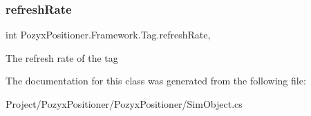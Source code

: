 \subsubsection{\texorpdfstring{refresh\+Rate}{refreshRate}}
{\footnotesize\ttfamily int Pozyx\+Positioner.\+Framework.\+Tag.\+refresh\+Rate\hspace{0.3cm}{\ttfamily [get]}, {\ttfamily [set]}}



The refresh rate of the tag 



The documentation for this class was generated from the following file\+:\begin{DoxyCompactItemize}
\item 
Project/\+Pozyx\+Positioner/\+Pozyx\+Positioner/Sim\+Object.\+cs\end{DoxyCompactItemize}
